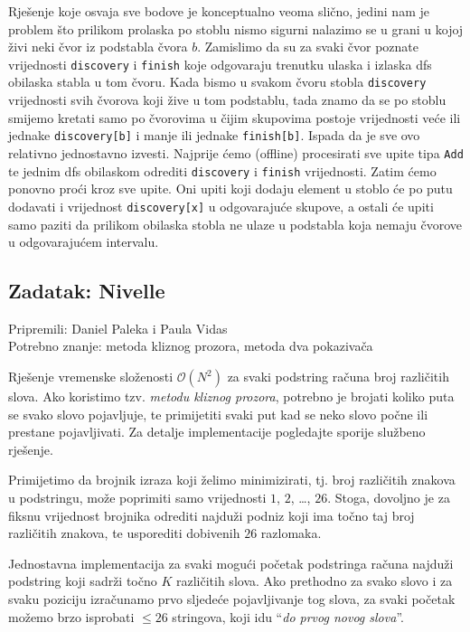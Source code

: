 \documentclass[a4paper]{article}
\begin{document}
Rješenje koje osvaja sve bodove je konceptualno veoma slično, jedini nam je
problem što prilikom prolaska po stoblu nismo sigurni nalazimo se u grani
u kojoj živi neki čvor iz podstabla čvora $b$. Zamislimo da su za svaki čvor
poznate vrijednosti \texttt{discovery} i \texttt{finish} koje odgovaraju
trenutku ulaska i izlaska dfs obilaska stabla u tom čvoru. Kada bismo u svakom
čvoru stobla \texttt{discovery} vrijednosti svih čvorova koji žive u tom
podstablu, tada znamo da se po stoblu smijemo kretati samo po čvorovima
u čijim skupovima postoje vrijednosti veće ili jednake \texttt{discovery[b]} i
manje ili jednake \texttt{finish[b]}. Ispada da je sve ovo relativno jednostavno
izvesti. Najprije ćemo (offline) procesirati sve upite tipa \texttt{Add} te
jednim dfs obilaskom odrediti \texttt{discovery} i \texttt{finish} vrijednosti.
Zatim ćemo ponovno proći kroz sve upite. Oni upiti koji dodaju element u stoblo
će po putu dodavati i vrijednost \texttt{discovery[x]} u odgovarajuće skupove, a
ostali će upiti samo paziti da prilikom obilaska stobla ne ulaze u podstabla
koja nemaju čvorove u odgovarajućem intervalu.

\clearpage

\subsection*{Zadatak: Nivelle}
\textsf{Pripremili: Daniel Paleka i Paula Vidas}\\
\textsf{Potrebno znanje: metoda kliznog prozora, metoda dva pokazivača}

Rješenje vremenske složenosti $\mathcal{O}(N^2)$ za svaki podstring računa broj
različitih slova. Ako koristimo tzv. \textit{metodu kliznog prozora}, potrebno
je brojati koliko puta se svako slovo pojavljuje, te primijetiti svaki put kad
se neko slovo počne ili prestane pojavljivati. Za detalje implementacije
pogledajte sporije službeno rješenje.

Primijetimo da brojnik izraza koji želimo minimizirati, tj. broj različitih
znakova u podstringu, može poprimiti samo vrijednosti $1$, $2$, \dots, $26$.
Stoga, dovoljno je za fiksnu vrijednost brojnika odrediti najduži podniz koji
ima točno taj broj različitih znakova, te usporediti dobivenih $26$ razlomaka.

Jednostavna implementacija za svaki mogući početak podstringa računa najduži
podstring koji sadrži točno $K$ različitih slova. Ako prethodno za svako slovo
i za svaku poziciju izračunamo prvo sljedeće pojavljivanje tog slova, za svaki
početak možemo brzo isprobati $\le 26$ stringova, koji idu “\textit{do prvog
novog slova}”.
\end{document}
